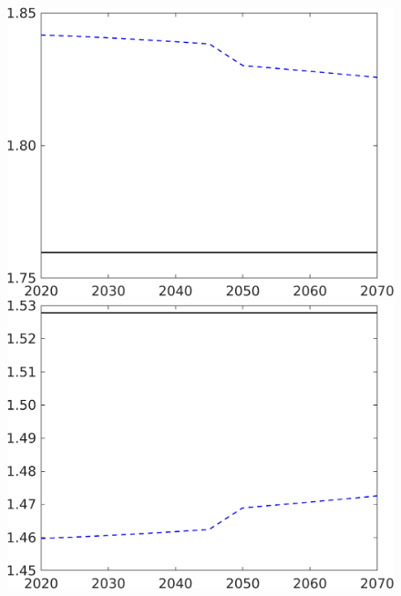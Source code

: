 \begin{figure}[h!!]
\begin{minipage}[]{0.32\textwidth}
	\end{minipage}
	\begin{minipage}[]{0.32\textwidth}
		\includegraphics[width=1\textwidth]{../../codding_model/own_basedOnFried/optimalPol_190722_tidiedUp/figures/all_10Aout22/CountTaul_modxgr_target_whwl_spillover0_sep1_extern0_PV1_etaa0.79_lgd0.png}
	\end{minipage}
	\begin{minipage}[]{0.32\textwidth}
		\includegraphics[width=1\textwidth]{../../codding_model/own_basedOnFried/optimalPol_190722_tidiedUp/figures/all_10Aout22/CountTaul_modxgr_target_hhhl_spillover0_sep1_extern0_PV1_etaa0.79_lgd0.png}

\end{minipage}
\end{figure}
